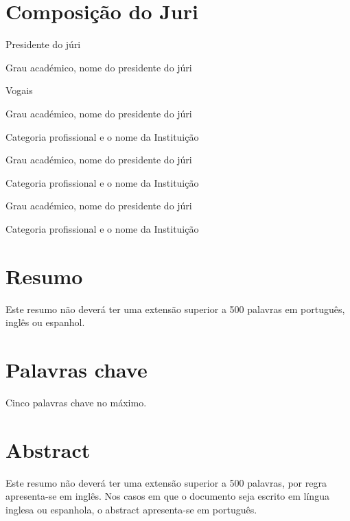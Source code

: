 \documentclass[twoside, 11pt]{article}
\begin{document}
 
\blankpage
\newpage

\section*{Composição do Juri}

\noindent Presidente do júri

Grau académico, nome do presidente do júri

\noindent Vogais

Grau académico, nome do presidente do júri

Categoria profissional e o nome da Instituição

\vspace{1cm}

Grau académico, nome do presidente do júri

Categoria profissional e o nome da Instituição

\vspace{1cm}

Grau académico, nome do presidente do júri

Categoria profissional e o nome da Instituição

\clearpage            %
\null                %
\newpage             %

\section*{Resumo}

Este resumo não deverá ter uma extensão superior a 500 palavras em  português, inglês ou espanhol.

\section*{Palavras chave}

Cinco palavras chave no máximo.

\clearpage            %
\null                %
\newpage             %

\section*{Abstract}

Este resumo não deverá ter uma extensão superior a 500 palavras, por regra apresenta-se em inglês. Nos casos em que o documento seja escrito em língua inglesa ou espanhola, o abstract apresenta-se em  português.
\end{document}
